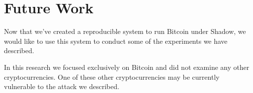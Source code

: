 \section{Future Work}
Now that we’ve created a reproducible system to run Bitcoin under Shadow, we would like to use this system to conduct some of the experiments we have described.

In this research we focused exclusively on Bitcoin and did not examine any other cryptocurrencies. One of these other cryptocurrencies may be currently vulnerable to the attack we described. 
